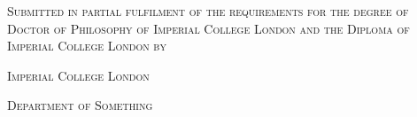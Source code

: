 
\begin{titlepage}

  \renewcommand*{\thepage}{Cover}

  \begin{center}

    \vfill{}

    {\LARGE\textcolor{ImperialBlue}{\textsc{\phdtitle}}\par}

    \vfill{}

    {\large\textsc{Submitted in partial fulfilment of the requirements for the degree of Doctor of Philosophy of Imperial College London and the Diploma of Imperial College London by}\par}

    \vfill{}

    {\Large\textsc{\phdauthor}\par}

    \vfill{}

    \titleornament{}

    \vfill{}

    {\large\textsc{Imperial College London}\par}

    {\large\textsc{Department of Something}\par}

    \vfill{}

    {\large\textsc{\phddate}\par}

  \end{center}

\end{titlepage}

\restoregeometry{}

\setcounter{page}{2}
